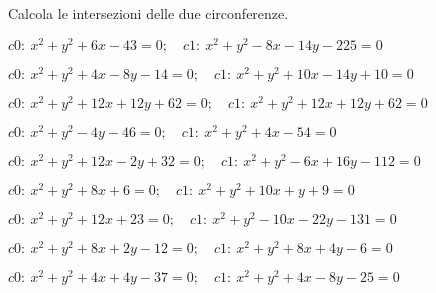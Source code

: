 \begin{esercizio}\label{ese:}
 Calcola le intersezioni delle due circonferenze.
 \begin{enumeratea}
  \item  \(c0:~x^2 + y^2 +6x -43 = 0; \quad c1:~x^2 + y^2 -8x -14y -225 = 
0\)\\
   \makebox[\linewidth][r]
   {[\(ar:~y = - x -13;~A \punto{-9}{-4};~B \punto{-7}{-6}\)]}
  \item  \(c0:~x^2 + y^2 +4x -8y -14 = 0; \quad c1:~x^2 + y^2 +10x -14y +10 
= 0\)\\
   \makebox[\linewidth][r]
   {[\(ar:~y = x +4;~A \punto{3}{7};~B \punto{-5}{-1}\)]}
  \item  \(c0:~x^2 + y^2 +12x +12y +62 = 0; \quad c1:~x^2 + y^2 +12x +12y 
+62=0\)\\
   \makebox[\linewidth][r]
   {[\(ar:~y = x -2;~A \punto{-7}{-9};~B \punto{-3}{-5}\)]}
  \item  \(c0:~x^2 + y^2 -4y -46 = 0; \quad c1:~x^2 + y^2 +4x -54 = 0\)\\
   \makebox[\linewidth][r]
   {[\(ar:~y = - x +2;~A \punto{-5}{7};~B \punto{5}{-3}\)]}
  \item  \(c0:~x^2 + y^2 +12x -2y +32 = 0; \quad c1:~x^2 + y^2 -6x +16y -112 
= 0\)\\
   \makebox[\linewidth][r]
   {[\(ar:~y = x +8;~A \punto{-5}{3};~B \punto{-8}{0}\)]}
  \item  \(c0:~x^2 + y^2 +8x +6 = 0; \quad c1:~x^2 + y^2 +10x +y +9 = 0\)\\
   \makebox[\linewidth][r]
   {[\(ar:~y = -2 x -3;~A \punto{-1}{-1};~B \punto{-3}{3}\)]}
  \item  \(c0:~x^2 + y^2 +12x +23 = 0; \quad c1:~x^2 + y^2 -10x -22y -131 = 
0\)\\
   \makebox[\linewidth][r]
   {[\(ar:~y = - x -7;~A \punto{-4}{-3};~B \punto{-9}{2}\)]}
  \item  \(c0:~x^2 + y^2 +8x +2y -12 = 0; \quad c1:~x^2 + y^2 +8x +4y -6 = 
0\)\\
   \makebox[\linewidth][r]
   {[\(ar:~y = -3;~A \punto{1}{-3};~B \punto{-9}{-3}\)]}
  \item  \(c0:~x^2 + y^2 +4x +4y -37 = 0; \quad c1:~x^2 + y^2 +4x -8y -25 = 
0\)\\
   \makebox[\linewidth][r]
   {[\(ar:~y = 1;~A \punto{-8}{1};~B \punto{4}{1}\)]}
 \end{enumeratea}
\end{esercizio}

